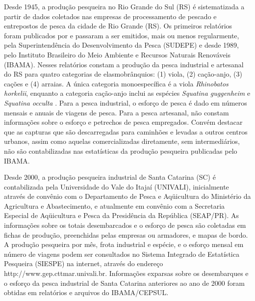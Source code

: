 \documentclass[a4paper,11pt,twoside,showtrims,onecolumn,openright,final]{memoir}
\begin{document}
Desde 1945, a produção pesqueira no Rio Grande do Sul (RS) é sistematizada a partir de
dados coletados nas empresas de processamento de pescado e entrepostos 
de pesca da cidade de Rio Grande (RS). Os primeiros relatórios foram publicados 
por \citet{barcellos1968,barcellos1969} e passaram a ser emitidos, mais ou menos regularmente, 
pela Superintendência do Desenvolvimento da Pesca (SUDEPE) e desde 1989, pelo Instituto Brasileiro 
do Meio Ambiente e Recursos Naturais Renováveis (IBAMA). Nesses relatórios constam a 
produção da pesca industrial e artesanal do RS para quatro categorias de elasmobrânquios:
(1) viola, (2) cação-anjo, (3) cações e (4) arraias. A única categoria monoespecífica é a 
viola \emph{Rhinobatos horkelii}, enquanto a categoria cação-anjo inclui
as espécies \emph{Squatina guggenheim} e \emph{Squatina occulta} \citep{araujo1986,araujo1995a}.
Para a pesca industrial, o esforço de pesca é dado em números mensais e anuais de viagens de pesca.
Para a pesca artesanal, não constam 
informações sobre o esforço e petrechos de pesca empregados. Convém destacar que as capturas 
que são descarregadas para caminhões e levadas a outros centros urbanos, assim como aquelas 
comercializadas diretamente, sem intermediários, não são contabilizadas nas 
estatísticas da produção pesqueira publicadas pelo IBAMA.

Desde 2000, a produção pesqueira industrial de Santa Catarina (SC) é contabilizada
pela Universidade do Vale do Itajaí (UNIVALI), inicialmente através de convênio com o 
Departamento de Pesca e Aqüicultura do Ministério da Agricultura e Abastecimento, 
e atualmente em convênio com a Secretaria Especial de Aqüicultura e Pesca da Presidência 
da República (SEAP/PR). As informações sobre os totais desembarcados e o esforço de pesca são
coletadas em fichas de produção, preenchidas pelas empresas ou armadores, e mapas de bordo. 
A produção pesqueira por mês, frota industrial e espécie, e o esforço
mensal em número de viagens podem ser consultados no Sistema Integrado de Estatística 
Pesqueira (SIESPE) na internet, através do endereço \mbox{http://www.gep.cttmar.univali.br}.
Informações exparsas sobre os desembarques e o esforço da pesca industrial de Santa Catarina
anteriores ao ano de 2000 foram obtidas em relatórios e arquivos do IBAMA/CEPSUL.

\end{document}
